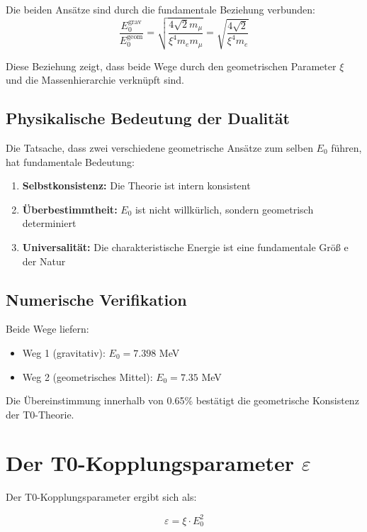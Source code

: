 	Die beiden Ansätze sind durch die fundamentale Beziehung verbunden:
	\begin{equation}
		\frac{E_0^{\text{grav}}}{E_0^{\text{geom}}} = \sqrt{\frac{4\sqrt{2} m_\mu}{\xi^4 m_e m_\mu}} = \sqrt{\frac{4\sqrt{2}}{\xi^4 m_e}}
	\end{equation}
	
	Diese Beziehung zeigt, dass beide Wege durch den geometrischen Parameter $\xi$ und die Massenhierarchie verknüpft sind.
	
	\subsection{Physikalische Bedeutung der Dualität}
	
	Die Tatsache, dass zwei verschiedene geometrische Ansätze zum selben $E_0$ führen, hat fundamentale Bedeutung:
	
	\begin{enumerate}
		\item \textbf{Selbstkonsistenz:} Die Theorie ist intern konsistent
		\item \textbf{Überbestimmtheit:} $E_0$ ist nicht willkürlich, sondern geometrisch determiniert
		\item \textbf{Universalität:} Die charakteristische Energie ist eine fundamentale Größ e der Natur
	\end{enumerate}
	
	\subsection{Numerische Verifikation}
	
	Beide Wege liefern:
	\begin{itemize}
		\item Weg 1 (gravitativ): $E_0 = 7.398$ MeV
		\item Weg 2 (geometrisches Mittel): $E_0 = 7.35$ MeV
	\end{itemize}
	
	Die Übereinstimmung innerhalb von 0.65\% bestätigt die geometrische Konsistenz der T0-Theorie.
	
	\section{Der T0-Kopplungsparameter $\varepsilon$}
	
	Der T0-Kopplungsparameter ergibt sich als:
	
	\begin{equation}
		\varepsilon = \xi \cdot E_0^2
	\end{equation}
	
